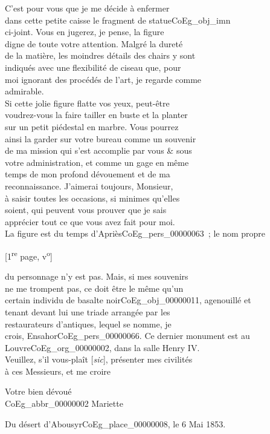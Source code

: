 \documentclass{book}
\begin{document}
C’est pour vous que je me décide à enfermer\\
dans cette petite caisse le fragment de statue\gls{CoEg_obj_imn}\\
ci-joint. Vous en jugerez, je pense, la figure\\
digne de toute votre attention. Malgré la dureté\\
de la matière, les moindres détails des chairs y sont\\
indiqués avec une flexibilité de ciseau que, pour\\
moi ignorant des procédés de l’art, je regarde comme\\
admirable.\\
\indent Si cette jolie figure flatte vos yeux, peut-être\\
voudrez-vous la faire tailler en buste et la planter\\
sur un petit piédestal en marbre. Vous pourrez\\
ainsi la garder sur votre bureau comme un souvenir\\
de ma mission qui s’est accomplie par vous \& sous\\
votre administration, et comme un gage en même\\
temps de mon profond dévouement et de ma\\
reconnaissance. J’aimerai toujours, Monsieur,\\
à saisir toutes les occasions, si minimes qu’elles\\
soient, qui peuvent vous prouver que je sais\\
apprécier tout ce que vous avez fait pour moi.\\
\indent La figure est du temps d’Apriès\gls{CoEg_pers_00000063}~; le nom propre
{\footnotesize \begin{center} {[1\textsuperscript{re} page, v\textsuperscript{o}]}\end{center}}
\noindent du personnage n’y est pas. Mais, si mes souvenirs\\
ne me trompent pas, ce doit être le même qu’un\\
certain individu de basalte noir\gls{CoEg_obj_00000011}, agenouillé et\\
tenant devant lui une triade arrangée par les\\
restaurateurs d’antiques, lequel se nomme, je\\
crois, Ensahor\gls{CoEg_pers_00000066}. Ce dernier monument est au\\
Louvre\gls{CoEg_org_00000002}, dans la salle Henry IV.\\
\indent Veuillez, s’il vous-plaît {[\textit{sic}]}, présenter mes civilités\\
à ces Messieurs, et me croire
\begin{center}\hspace{5cm} Votre bien dévoué\\
\hspace{5cm} \gls{CoEg_abbr_00000002} Mariette\end{center}
\indent Du désert d’Abousyr\gls{CoEg_place_00000008}, le 6 Mai 1853.
\hypertarget{CoEg_Mariette_1853-07-30}{}
\end{document}

